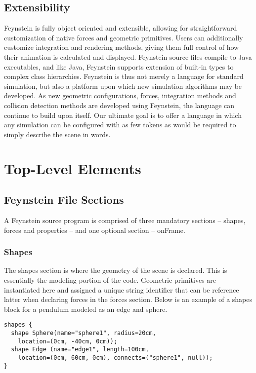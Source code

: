 \documentclass[letterpaper]{article}
\begin{document}
\subsection{Extensibility}
Feynstein is fully object oriented and extensible, allowing for
straightforward customization of native forces and geometric
primitives. Users can additionally customize integration and rendering
methods, giving them full control of how their animation is calculated
and displayed.  Feynstein source files compile to Java executables,
and like Java, Feynstein supports extension of built-in types to
complex class hierarchies. Feynstein is thus not merely a language for
standard simulation, but also a platform upon which new simulation
algorithms may be developed.  As new geometric configurations, forces,
integration methods and collision detection methods are developed
using Feynstein, the language can continue to build upon itself. Our
ultimate goal is to offer a language in which any simulation can be
configured with as few tokens as would be required to simply describe
the scene in words.


\section{Top-Level Elements}

\subsection{Feynstein File Sections}
 
A Feynstein source program is comprised of three mandatory sections --
shapes, forces and properties -- and one optional section -- onFrame.
 
\subsubsection{Shapes}
\label{sec:shapes}
The shapes section is where the geometry of the scene is
declared. This is essentially the modeling portion of the
code. Geometric primitives are instantiated here and assigned a unique
string identifier that can be reference latter when declaring forces
in the forces section. Below is an example of a shapes block for a
pendulum modeled as an edge and sphere.

\begin{verbatim}
shapes {
  shape Sphere(name="sphere1", radius=20cm, 
    location=(0cm, -40cm, 0cm));
  shape Edge (name="edge1", length=100cm, 
    location=(0cm, 60cm, 0cm), connects=("sphere1", null));
}
\end{verbatim}
 
\end{document}
